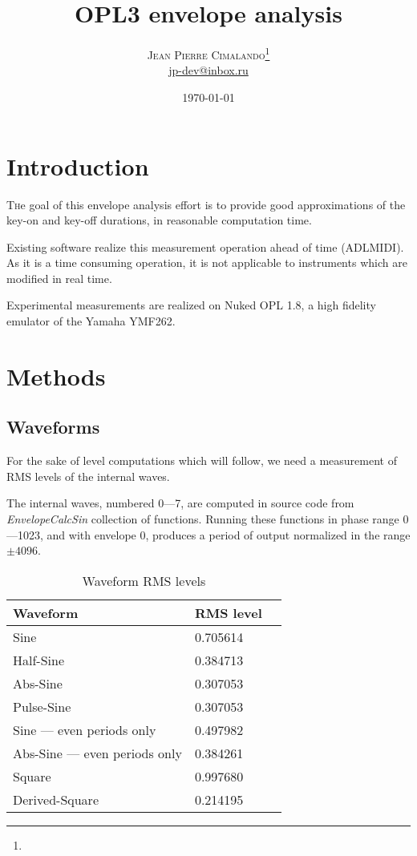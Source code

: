 \documentclass[twoside,twocolumn]{article}
\title{OPL3 envelope analysis} %
\author{%
\textsc{Jean Pierre Cimalando}\thanks{} \\[1ex] %
\normalsize \href{mailto:jp-dev@inbox.ru}{jp-dev@inbox.ru} %
}
\date{\today} %
\begin{document}
\maketitle


\section{Introduction}

\lettrine[nindent=0em,lines=3]{T} he goal of this envelope analysis effort is to provide
good approximations of the key-on and key-off durations, in reasonable computation time.

Existing software realize this measurement operation ahead of time (ADLMIDI). As it is a
time consuming operation, it is not applicable to instruments which are modified in real time.

Experimental measurements are realized on Nuked OPL 1.8, a high fidelity emulator of the
Yamaha YMF262.


\section{Methods}

\subsection{Waveforms}

For the sake of level computations which will follow, we need a measurement of RMS levels
of the internal waves.

The internal waves, numbered 0—7, are computed in source code from \emph{EnvelopeCalcSin}
collection of functions. Running these functions in phase range 0—1023, and with envelope
0, produces a period of output normalized in the range $\pm 4096$.

\begin{table}
\begin{tabular}{llr}
\toprule
Waveform & RMS level \\
\midrule
Sine      & 0.705614      \\
Half-Sine      & 0.384713      \\
Abs-Sine      & 0.307053      \\
Pulse-Sine      & 0.307053      \\
Sine — even periods only      & 0.497982      \\
Abs-Sine — even periods only      & 0.384261      \\
Square      & 0.997680      \\
Derived-Square      & 0.214195      \\
\bottomrule
\end{tabular}
\caption{Waveform RMS levels}\label{tab:wave-rms}
\end{table}
\end{document}
